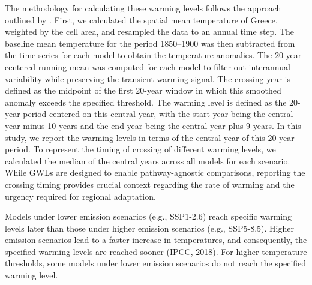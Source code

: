 \documentclass[pdflatex,sn-chicago]{sn-jnl}%
\theoremstyle{thmstyleone}%
\theoremstyle{thmstyletwo}%
\theoremstyle{thmstylethree}%
\begin{document}
The methodology for calculating these warming levels follows the approach outlined by \citet{Hauser-GWL-2022}. First, we calculated the spatial mean temperature of Greece, weighted by the cell area, and resampled the data to an annual time step. The baseline mean temperature for the period 1850--1900 was then subtracted from the time series for each model to obtain the temperature anomalies. The 20-year centered running mean was computed for each model to filter out interannual variability while preserving the transient warming signal. The crossing year is defined as the midpoint of the first 20-year window in which this smoothed anomaly exceeds the specified threshold. The warming level is defined as the 20-year period centered on this central year, with the start year being the central year minus 10 years and the end year being the central year plus 9 years. In this study, we report the warming levels in terms of the central year of this 20-year period. To represent the timing of crossing of different warming levels, we calculated the median of the central years across all models for each scenario. While GWLs are designed to enable pathway-agnostic comparisons, reporting the crossing timing provides crucial context regarding the rate of warming and the urgency required for regional adaptation.

Models under lower emission scenarios (e.g., SSP1-2.6) reach specific warming levels later than those under higher emission scenarios (e.g., SSP5-8.5). Higher emission scenarios lead to a faster increase in temperatures, and consequently, the specified warming levels are reached sooner (IPCC, 2018). For higher temperature thresholds, some models under lower emission scenarios do not reach the specified warming level.
\end{document}
